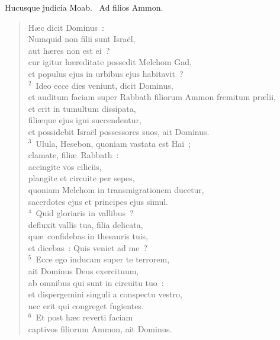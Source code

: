 Hucusque judicia Moab.
~\lettrine[lines=10,image=true,loversize=0.05,lraise=-0.03]{A}{}d filios Ammon. \begin{flushleft}\begin{verse}\vspace{6pt}H\ae c dicit Dominus~:\\ Numquid non filii sunt Isra\"el,\\ aut h\ae res non est ei~?\\ cur igitur h\ae reditate possedit Melchom Gad,\\ et populus ejus in urbibus ejus habitavit~?\\
${}^{2}$~Ideo ecce dies veniunt, dicit Dominus,\\ et auditum faciam super Rabbath filiorum Ammon fremitum pr\ae lii,\\ et erit in tumultum dissipata,\\ fili\ae que ejus igni succendentur,\\ et possidebit Isra\"el possessores suos, ait Dominus.\\
${}^{3}$~Ulula, Hesebon, quoniam vastata est Hai~;\\ clamate, fili\ae\ Rabbath~:\\ accingite vos ciliciis,\\ plangite et circuite per sepes,\\ quoniam Melchom in transmigrationem ducetur,\\ sacerdotes ejus et principes ejus simul.\\
${}^{4}$~Quid gloriaris in vallibus~?\\ defluxit vallis tua, filia delicata,\\ qu\ae\ confidebas in thesauris tuis,\\ et dicebas~: Quis veniet ad me~?\\
${}^{5}$~Ecce ego inducam super te terrorem,\\ ait Dominus Deus exercituum,\\ ab omnibus qui sunt in circuitu tuo~:\\ et dispergemini singuli a conspectu vestro,\\ nec erit qui congreget fugientes.\\
${}^{6}$~Et post h\ae c reverti faciam\\ captivos filiorum Ammon, ait Dominus.\end{verse}\end{flushleft}


